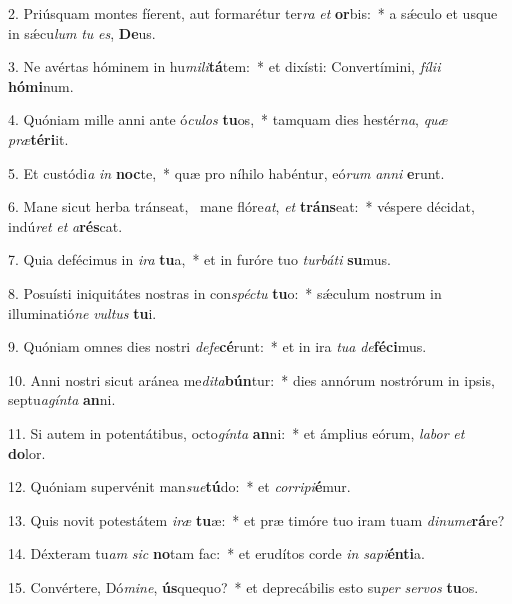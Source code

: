 2. Priúsquam montes fíerent, aut formarétur ter\textit{ra} \textit{et} \textbf{or}bis:~*  a sǽculo et usque in sǽcu\textit{lum} \textit{tu} \textit{es}, \textbf{De}us.\

3. Ne avértas hóminem in hu\textit{mi}\textit{li}\textbf{tá}tem:~*  et dixísti: Convertímini, \textit{fí}\textit{li}\textit{i} \textbf{hó}\textbf{mi}num.\

4. Quóniam mille anni ante ó\textit{cu}\textit{los} \textbf{tu}os,~*  tamquam dies hestér\textit{na}, \textit{quæ} \textit{præ}\textbf{tér}\textbf{i}it.\

5. Et custódi\textit{a} \textit{in} \textbf{noc}te,~*  quæ pro níhilo habéntur, eó\textit{rum} \textit{an}\textit{ni} \textbf{e}runt.\

6. Mane sicut herba tránseat, \dag\  mane flóre\textit{at}, \textit{et} \textbf{tráns}eat:~*  véspere décidat, indú\textit{ret} \textit{et} \textit{a}\textbf{rés}cat.\

7. Quia defécimus in \textit{i}\textit{ra} \textbf{tu}a,~*  et in furóre tuo \textit{tur}\textit{bá}\textit{ti} \textbf{su}mus.\

8. Posuísti iniquitátes nostras in con\textit{spéc}\textit{tu} \textbf{tu}o:~*  sǽculum nostrum in illuminatió\textit{ne} \textit{vul}\textit{tus} \textbf{tu}i.\

9. Quóniam omnes dies nostri \textit{de}\textit{fe}\textbf{cé}runt:~*  et in ira \textit{tu}\textit{a} \textit{de}\textbf{fé}\textbf{ci}mus.\

10. Anni nostri sicut aránea me\textit{di}\textit{ta}\textbf{bún}tur:~*  dies annórum nostrórum in ipsis, septu\textit{a}\textit{gín}\textit{ta} \textbf{an}ni.\

11. Si autem in potentátibus, octo\textit{gín}\textit{ta} \textbf{an}ni:~*  et ámplius eórum, \textit{la}\textit{bor} \textit{et} \textbf{do}lor.\

12. Quóniam supervénit man\textit{su}\textit{e}\textbf{tú}do:~*  et \textit{cor}\textit{ri}\textit{pi}\textbf{é}mur.\

13. Quis novit potestátem \textit{i}\textit{ræ} \textbf{tu}æ:~*  et præ timóre tuo iram tuam \textit{di}\textit{nu}\textit{me}\textbf{rá}re?\

14. Déxteram tu\textit{am} \textit{sic} \textbf{no}tam fac:~*  et erudítos corde \textit{in} \textit{sa}\textit{pi}\textbf{én}\textbf{ti}a.\

15. Convértere, Dó\textit{mi}\textit{ne}, \textbf{ús}quequo?~*  et deprecábilis esto su\textit{per} \textit{ser}\textit{vos} \textbf{tu}os.\

